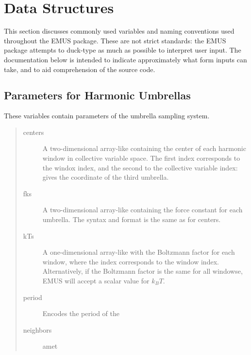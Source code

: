 \documentclass[letterpaper,10pt,english]{sphinxmanual}
\begin{document}
\chapter{Data Structures}
\label{datastructures:data-structures}\label{datastructures::doc}
This section discusses commonly used variables and naming conventions used throughout the EMUS package. These are not strict standards: the EMUS package attempts to duck-type as much as possible to interpret user input.  The documentation below is intended to indicate approximately what form inputs can take, and to aid comprehension of the source code.


\section{Parameters for Harmonic Umbrellas}
\label{datastructures:parameters-for-harmonic-umbrellas}
These variables contain parameters of the umbrella sampling system.
\begin{quote}\begin{description}
\item[{centers}] \leavevmode
A two-dimensional array-like containing the center of each harmonic window in collective variable space.  The first index corresponds to the windox index, and the second to the collective variable index:  gives the coordinate of the third umbrella.

\item[{fks}] \leavevmode
A two-dimensional array-like containing the force constant for each umbrella.  The syntax and format is the same as for centers.

\item[{kTs}] \leavevmode
A one-dimensional array-like with the Boltzmann factor for each window, where the index corresponds to the window index. Alternatively, if the Boltzmann factor is the same for all windowse, EMUS will accept a scalar value for \(k_B T\).

\item[{period}] \leavevmode
Encodes the period of the

\item[{neighbors}] \leavevmode
amet

\end{description}\end{quote}
\end{document}
